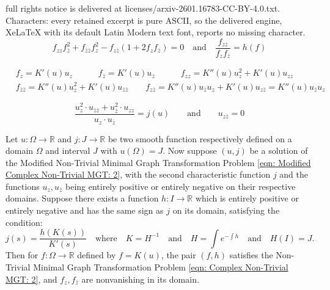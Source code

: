 \documentclass[10pt,a4paper]{amsart}
\begin{document}
full rights notice is delivered at licenses/arxiv-2601.16783-CC-BY-4.0.txt. Characters: every retained excerpt is pure ASCII, so the delivered engine, XeLaTeX with its default Latin Modern text font, reports no missing character.
   \begin{equation}
   	\label{eqn: Complex Non-Trivial MGT: 2}
   	\boxed{f_{zz}f_{\bar{z}}^2 + f_{\bar{z}\bar{z}}f_{z}^2 - f_{z\bar{z}}(1 + 2f_z f_{\bar{z}}) = 0} \quad \text{and} \quad \boxed{\frac{f_{z\bar{z}}}{f_z f_{\bar{z}}} = h(f)}
   \end{equation}

  \begin{align}
  	\label{eqn: partial derivatives of f}
  	&\boxed{f_z=K'(u)u_z} \quad\quad\quad \boxed{f_{\bar{z}}=K'(u) u_{\bar{z}}} \quad\quad\quad \boxed{f_{zz}=K''(u) u_z^2+K'(u)u_{zz}}\\
  	\label{eqn: second partial derivatives of f}
  	&\boxed{f_{\bar{z}\bar{z}}=K''(u)u_{\bar{z}}^2+K'(u)u_{\bar{z}\bar{z}}} \quad\quad \boxed{f_{z\bar{z}}=K''(u)u_{\bar{z}}u_z+K'(u)u_{z\bar{z}}=K''(u)u_{\bar{z}}u_z}    
  \end{align}

  \begin{equation}
  	\label{eqn: Modified Complex Non-Trivial MGT: 2}
  	\boxed{\frac{u_z^2\cdot u_{\bar{z}\bar{z}}+ u_{\bar{z}}^2\cdot u_{zz}}{u_z \cdot u_{\bar{z}}}=j(u)} \quad\quad\text{and}\quad\quad \boxed{u_{z\bar{z}}=0}    
  \end{equation}

\begin{proposition}
	Let \(u:\Omega\longrightarrow\mathbb{R}\) and \(j:J\longrightarrow\mathbb{R}\) be two smooth function respectively defined on a domain \(\Omega\) and interval \(J\) with \(u(\Omega)=J\). Now suppose  \((u,j)\) be a solution of the Modified Non-Trivial Minimal Graph Transformation Problem \ref{eqn: Modified Complex Non-Trivial MGT: 2}, with the second characteristic function \(j\) and the functions \(u_z, u_{\bar z}\) being entirely positive or entirely negative on their respective domains. Suppose there exists a function \(h: I\longrightarrow\mathbb{R}\) which is entirely positive or entirely negative and has the same sign as \(j\) on its domain, satisfying the condition:
	\[
	j(s) = \frac{h(K(s))}{K'(s)} \quad \text{where} \quad K = H^{-1} \quad \text{and} \quad H = \int e^{-\int h} \quad \text{and} \quad H(I)=J.
	\]
	Then for \(f:\Omega\longrightarrow\mathbb{R}\) defined by \(f = K(u)\), the pair \((f,h)\) satisfies the Non-Trivial Minimal Graph Transformation Problem \ref{eqn: Complex Non-Trivial MGT: 2}, and \(f_z,f_{\bar z}\) are nonvanishing in its domain.
\end{proposition}
\end{document}
